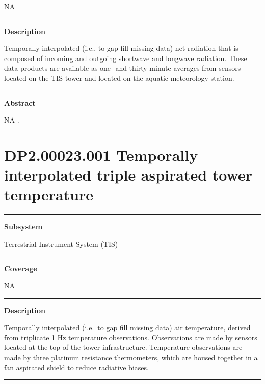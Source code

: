 \documentclass[]{article}
\begin{document}
NA

\begin{center}\rule{0.5\linewidth}{\linethickness}\end{center}

\textbf{Description}

Temporally interpolated (i.e., to gap fill missing data) net radiation
that is composed of incoming and outgoing shortwave and longwave
radiation. These data products are available as one- and thirty-minute
averages from sensors located on the TIS tower and located on the
aquatic meteorology station.

\begin{center}\rule{0.5\linewidth}{\linethickness}\end{center}

\textbf{Abstract}

NA \newpage
.

\section{DP2.00023.001 Temporally interpolated triple aspirated tower
temperature}\label{dp2.00023.001-temporally-interpolated-triple-aspirated-tower-temperature}

\begin{center}\rule{0.5\linewidth}{\linethickness}\end{center}

\textbf{Subsystem}

Terrestrial Instrument System (TIS)

\begin{center}\rule{0.5\linewidth}{\linethickness}\end{center}

\textbf{Coverage}

NA

\begin{center}\rule{0.5\linewidth}{\linethickness}\end{center}

\textbf{Description}

Temporally interpolated (i.e.~to gap fill missing data) air temperature,
derived from triplicate 1 Hz temperature observations. Observations are
made by sensors located at the top of the tower infrastructure.
Temperature observations are made by three platinum resistance
thermometers, which are housed together in a fan aspirated shield to
reduce radiative biases.

\begin{center}\rule{0.5\linewidth}{\linethickness}\end{center}
\end{document}
